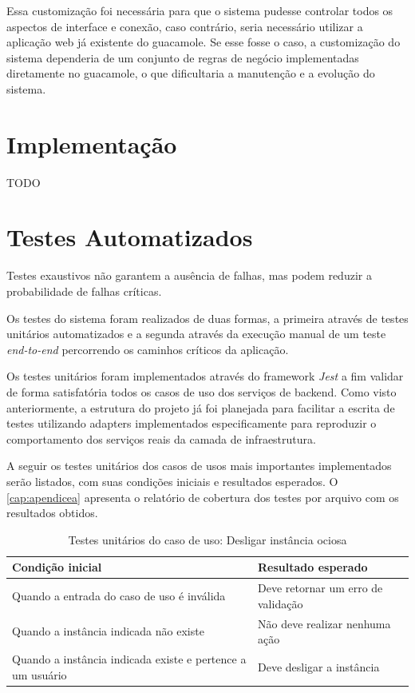 Essa customização foi necessária para que o sistema pudesse controlar todos os aspectos de interface e conexão, caso contrário, seria necessário utilizar a aplicação web já existente do \gls{guacamole}. Se esse fosse o caso, a customização do sistema dependeria de um conjunto de regras de negócio implementadas diretamente no \gls{guacamole}, o que dificultaria a manutenção e a evolução do sistema.

\section{Implementa\c{c}\~ao}
\label{sec:implementacao}

TODO

\section{Testes Automatizados}
\label{sec:testesAutomatizados}

Testes exaustivos não garantem a ausência de falhas, mas podem reduzir a probabilidade de falhas críticas. \citep{pressman2016}

Os testes do sistema foram realizados de duas formas, a primeira através de testes unitários automatizados e a segunda através da execução manual de um teste \textit{end-to-end} percorrendo os caminhos críticos da aplicação.

Os testes unitários foram implementados através do framework \textit{Jest} a fim validar de forma satisfatória todos os casos de uso dos serviços de backend. Como visto anteriormente, a estrutura do projeto já foi planejada para facilitar a escrita de testes utilizando \glspl{adapter} implementados especificamente para reproduzir o comportamento dos serviços reais da camada de infraestrutura.

A seguir os testes unitários dos casos de usos mais importantes implementados serão listados, com suas condições iniciais e resultados esperados. O \autoref{cap:apendicea} apresenta o relatório de cobertura dos testes por arquivo com os resultados obtidos.

\begin{table}[h]
\caption{Testes unitários do caso de uso: Desligar instância ociosa}
\label{tab:testeDesligarInstanciaOciosa}
\begin{tabularx}{\textwidth}{p{} p{}}
\toprule
\textbf{Condição inicial} & \textbf{Resultado esperado} \\ \midrule

Quando a entrada do caso de uso é inválida & Deve retornar um erro de validação \\ \hline

Quando a instância indicada não existe & Não deve realizar nenhuma ação \\ \hline

Quando a instância indicada existe e pertence a um usuário & Deve desligar a instância \\ 

\bottomrule
\end{tabularx}
\end{table}

